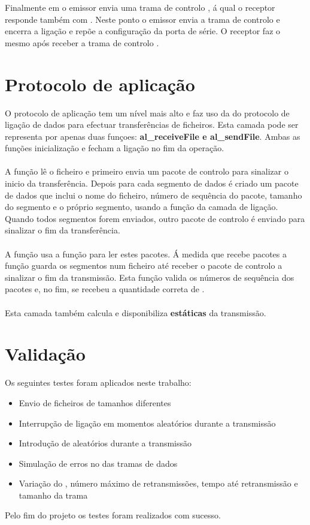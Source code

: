 \documentclass[11pt]{article}
\begin{document}
Finalmente em \textbf{} o emissor envia uma trama de controlo , á qual o receptor responde também com . Neste ponto o emissor envia a trama de controlo  e encerra a ligação e repõe a configuração da porta de série. O receptor faz o mesmo após receber a trama de controlo .

\newpage
\thispagestyle{fancy}
\fancyhf{}
\fancyfoot[R]{\thepage}
\renewcommand*{\footrulewidth}{1pt}

\section*{Protocolo de aplicação}
O protocolo de aplicação tem um nível mais alto e faz uso da  do protocolo de ligação de dados para efectuar transferências de ficheiros. Esta camada pode ser representa por apenas duas funçoes: \textbf{al\_receiveFile e al\_sendFile}. Ambas as funções inicialização e fecham a ligação no fim da operação.\\\\ A função \textbf{} lê o ficheiro e primeiro envia um pacote de controlo para sinalizar o inicio da transferência. Depois para cada segmento de dados é criado um pacote de dados que inclui o nome do ficheiro, número de sequência do pacote, tamanho do segmento e o próprio segmento, usando a função  da camada de ligação. Quando todos segmentos forem enviados, outro pacote de controlo é enviado para sinalizar o fim da transferência.\\\\

A função \textbf{} usa a função  para ler estes pacotes. Á medida que recebe pacotes a função guarda os segmentos num ficheiro até receber o pacote de controlo a sinalizar o fim da transmissão. Esta função valida os números de sequência dos pacotes e, no fim, se recebeu a quantidade correta de .\\\\
Esta camada também calcula e disponibiliza \textbf{estáticas} da transmissão.


\section*{Validação}
Os seguintes testes foram aplicados neste trabalho:
\begin{itemize}
    \item Envio de ficheiros de tamanhos diferentes
    \item Interrupção de ligação em momentos aleatórios durante a transmissão
    \item Introdução de  aleatórios durante a transmissão
    \item Simulação de erros no  das tramas de dados
    \item Variação do , número máximo de retransmissões, tempo até retransmissão e tamanho da trama
\end{itemize}
Pelo fim do projeto os testes foram realizados com sucesso.
\end{document}
